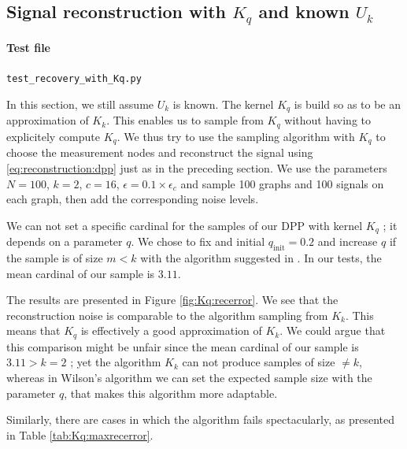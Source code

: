 \documentclass{article}
\begin{document}


\subsection[Signal reconstruction with Kq and known Uk]{Signal reconstruction with $K_q$ and known $U_k$}


\paragraph{Test file} \verb#test_recovery_with_Kq.py#


In this section, we still assume $U_k$ is known. The kernel $K_q$ is build so as to be an approximation of $K_k$. This enables us to sample from $K_q$ without having to explicitely compute $K_q$. We thus try to use the sampling algorithm with $K_q$ to choose the measurement nodes and reconstruct the signal using \eqref{eq:reconstruction:dpp} just as in the preceding section. We use the parameters $N=100$, $k=2$, $c=16$, $\epsilon = 0.1 \times \epsilon_c$ and sample 100 graphs and 100 signals on each graph, then add the corresponding noise levels.


We can not set a specific cardinal for the samples of our DPP with kernel $K_q$ ; it depends on a parameter $q$. We chose to fix and initial $q_\text{init}=0.2$ and increase $q$ if the sample is of size $m < k$ with the algorithm suggested in \cite{avena2013}. In our tests, the mean cardinal of our sample is $3.11$. 


The results are presented in Figure \ref{fig:Kq:recerror}. We see that the reconstruction noise is comparable to the algorithm sampling from $K_k$. This means that $K_q$ is effectively a good approximation of $K_k$. We could argue that this comparison might be unfair since the mean cardinal of our sample is $3.11 > k = 2$ ; yet the algorithm $K_k$ can not produce samples of size $\neq k$, whereas in Wilson's algorithm we can set the expected sample size with the parameter $q$, that makes this algorithm more adaptable. 


Similarly, there are cases in which the algorithm fails spectacularly, as presented in Table \ref{tab:Kq:maxrecerror}.
\end{document}
